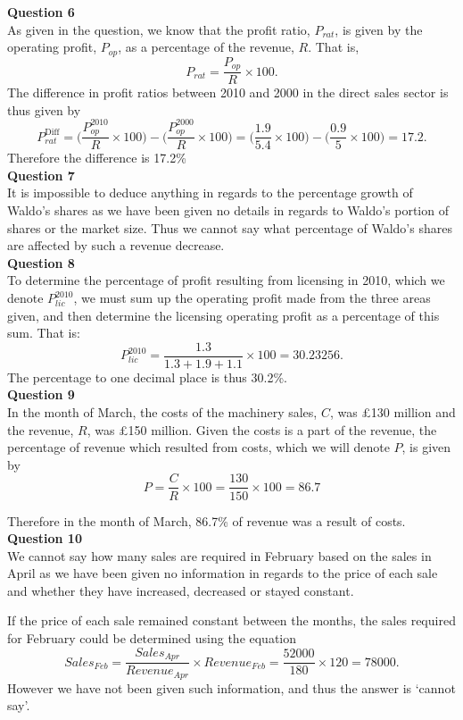 \documentclass{article}
\begin{document}
\textbf{Question 6} \\
As given in the question, we know that the profit ratio, $P_{rat}$, is given by the operating profit, $P_{op}$, as a percentage of the revenue, $R$. That is,
$$P_{rat} = \frac{P_{op}}{R} \times 100.$$
The difference in profit ratios between 2010 and 2000 in the direct sales sector is thus given by 
$$P^{\text{Diff}}_{rat} = \Bigg( \frac{P^{2010}_{op}}{R} \times 100 \Bigg)- \Bigg( \frac{P^{2000}_{op}}{R} \times 100 \Bigg)= \Bigg( \frac{1.9}{5.4} \times 100 \Bigg)- \Bigg(\frac{0.9}{5} \times 100 \Bigg) = 17.2.$$
Therefore the difference is 17.2\% \\

\textbf{Question 7} \\
It is impossible to deduce anything in regards to the percentage growth of Waldo's shares as we have been given no details in regards to Waldo's portion of shares or the market size. Thus we cannot say what percentage of Waldo's shares are affected by such a revenue decrease. \\

\textbf{Question 8} \\
To determine the percentage of profit resulting from licensing in 2010, which we denote $P_{lic}^{2010}$, we must sum up the operating profit made from the three areas given, and then determine the licensing operating profit as a percentage of this sum. That is:
$$P_{lic}^{2010}=\frac{1.3}{1.3+1.9+1.1} \times 100 = 30.23256.$$
The percentage to one decimal place is thus 30.2\%.\\

\textbf{Question 9} \\
In the month of March, the costs of the machinery sales, $C$, was \pounds 130 million and the revenue, $R$, was \pounds 150 million. Given the costs is a part of the revenue, the percentage of revenue which resulted from costs, which we will denote $P$, is given by
$$P = \frac{C}{R} \times 100 = \frac{130}{150} \times 100 = 86.7$$

Therefore in the month of March, 86.7\% of revenue was a result of costs.\\

\textbf{Question 10} \\
We cannot say how many sales are required in February based on the sales in April as we have been given no information in regards to the price of each sale and whether they have increased, decreased or stayed constant.

If the price of each sale remained constant between the months, the sales required for February could be determined using the equation
$$ Sales_{Feb}= \frac{Sales_{Apr}}{Revenue_{Apr}} \times Revenue_{Feb} = \frac{52000}{180} \times 120 = 78000.$$
However we have not been given such information, and thus the answer is `cannot say'.\\
\end{document}
